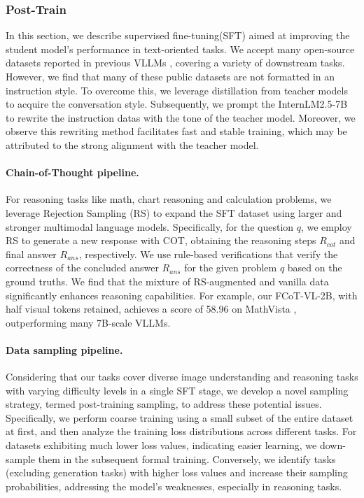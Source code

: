 \subsubsection{Post-Train}\label{sec:pt}
In this section, we describe supervised fine-tuning(SFT) aimed at improving the student model's performance in text-oriented tasks. We accept many open-source datasets reported in previous VLLMs \cite{chen2024far}, covering a variety of downstream tasks. However, we find that many of these public datasets are not formatted in an instruction style. To overcome this, we leverage distillation from teacher models to acquire the conversation style. Subsequently, we prompt the InternLM2.5-7B \cite{cai2024internlm2} to rewrite the instruction datas with the tone of the teacher model. Moreover, we observe this rewriting method facilitates fast and stable training, which may be attributed to the strong alignment with the teacher model.


\paragraph{Chain-of-Thought pipeline.} \label{abnormal}For reasoning tasks like math, chart reasoning and calculation problems, we leverage Rejection Sampling (RS) to expand the SFT dataset using larger and stronger multimodal language models. Specifically, for the question $q$, we employ RS to generate a new response with COT, obtaining the reasoning steps $R_{cot}$ and final answer $R_{ans}$, respectively. We use rule-based verifications that verify the correctness of the concluded answer $R_{ans}$ for the given problem $q$ based on the ground truths. We find that the mixture of RS-augmented and vanilla data significantly enhances reasoning capabilities. For example, our FCoT-VL-2B, with half visual tokens retained, achieves a score of 58.96 on MathVista \cite{lu2024mathvista}, outperforming many 7B-scale VLLMs.

\paragraph{Data sampling pipeline.} Considering that our tasks cover diverse image understanding and reasoning tasks with varying difficulty levels in a single SFT stage, we develop a novel sampling strategy, termed post-training sampling, to address these potential issues. Specifically, we perform coarse training using a small subset of the entire dataset at first, and then analyze the training loss distributions across different tasks. For datasets exhibiting much lower loss values, indicating easier learning, we down-sample them in the subsequent formal training. Conversely, we identify tasks (excluding generation tasks) with higher loss values and increase their sampling probabilities, addressing the model's weaknesses, especially in reasoning tasks.
 
